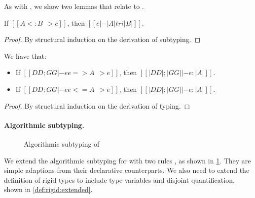 As with \namee, we show two lemmas that relate \fnamee to \tnamee.

\begin{lemma}
  If $[[A <: B ~~> c]]$, then $[[c |-  |A| tri |B|]]$.
  \label{lemma:sub-correct:fi}
\end{lemma}
\begin{proof}
  By structural induction on the derivation of subtyping.
\end{proof}


\begin{lemma} We have that:
  \begin{itemize}
  \item If $[[DD ; GG |- ee => A ~~> e]]$, then $[[ |DD| ; |GG| |- e : |A | ]]$.
  \item If $[[DD ; GG |- ee <= A ~~> e]]$, then $[[ |DD| ; |GG| |- e : |A | ]]$.
  \end{itemize}
\end{lemma}
\begin{proof}
  By structural induction on the derivation of typing.
\end{proof}


\paragraph{Algorithmic subtyping.}



\begin{figure}[t]
  \centering
  \caption{Algorithmic subtyping of \fnamee}
  \label{fig:algo:sub:fi}
\end{figure}

We extend the algorithmic subtyping for \namee with two rules
, as shown in \cref{fig:algo:sub:fi}. They are simple
adaptions from their declarative counterparts. We also need to extend the
definition of rigid types to include type variables and disjoint quantification,
shown in \cref{def:rigid:extended}.

\begin{definition} \label{def:rigid:extended}
\end{definition}

